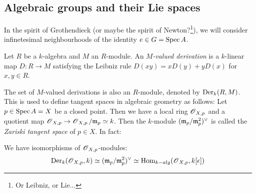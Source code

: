 \documentclass[11pt, english]{article}
\begin{document}
\subsection{Algebraic groups and their Lie spaces}

In the spirit of Grothendieck (or maybe the spirit of Newton?\footnote{Or Leibniz, or Lie...}), we will consider infinetesimal neighbourhoods of the identity $e \in G=\operatorname{Spec} A$.

\begin{defi}
 Let $R$ be a $k$-algebra and $M$ an $R$-module. An \emph{$M$-valued derivation} is a $k$-linear map $D:R \to M$ satisfying the Leibniz rule $D(xy)=xD(y) + yD(x)$ for $x,y \in R$.
\end{defi}

The set of $M$-valued derivations is also an $R$-module, denoted by $\operatorname{Der}_k(R,M)$. This is used to define tangent spaces in algebraic geometry as follows: Let $p \in \operatorname{Spec} A=X$ be a closed point. Then we have a local ring $\operatorname{\mathscr{O}}_{X,p}$ and a quotient map $\operatorname{\mathscr{O}}_{X,p} \to \operatorname{\mathscr{O}}_{X,p}/\mathfrak{m}_p \simeq  k$. Then the $k$-module $(\mathfrak{m}_p/\mathfrak{m}_p^2)^\vee$ is called the \emph{Zariski tangent space} of $p \in X$. In fact:
\begin{prop}
\label{propzariski}
We have isomorphisms of $\operatorname{\mathscr{O}}_{X,p}$-modules:
$$ \operatorname{Der}_k(\operatorname{\mathscr{O}}_{X,p},k) \simeq (\mathfrak{m}_p/\mathfrak{m}_p^2)^\vee \simeq \operatorname{Hom}_{k-alg}(\operatorname{\mathscr{O}}_{X,p},k[\epsilon])
$$
\end{prop}
\end{document}
